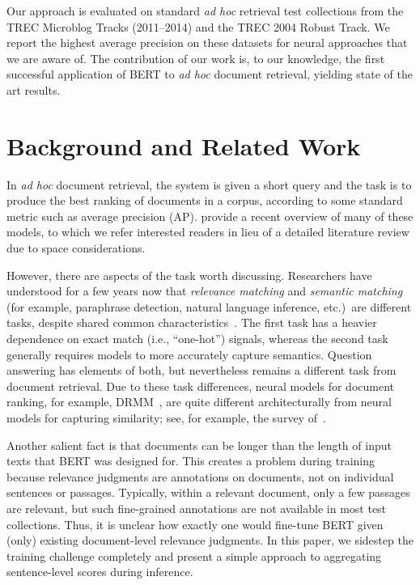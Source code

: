 \documentclass[11pt,a4paper]{article}
\begin{document}
Our approach is evaluated on standard {\it ad hoc} retrieval test collections from the TREC Microblog Tracks (2011--2014) and the TREC 2004 Robust Track.
We report the highest average precision on these datasets for neural approaches that we are aware of.
The contribution of our work is, to our knowledge, the first successful application of BERT to {\it ad hoc} document retrieval, yielding state of the art results.

\section{Background and Related Work}

In {\it ad hoc} document retrieval, the system is given a short query  and the task is to produce the best ranking of documents in a corpus, according to some standard metric such as average precision (AP).
\citet{MitraBhaskar_Craswell_2019} provide a recent overview of many of these models, to which we refer interested readers in lieu of a detailed literature review due to space considerations.

However, there are aspects of the task worth discussing.
Researchers have understood for a few years now that {\it relevance matching} and {\it semantic matching} (for example, paraphrase detection, natural language inference, etc.)~are different tasks, despite shared common characteristics~\cite{Guo:2016:DRM:2983323.2983769}.
The first task has a heavier dependence on exact match (i.e., ``one-hot'') signals, whereas the second task generally requires models to more accurately capture semantics.
Question answering has elements of both, but nevertheless remains a different task from document retrieval.
Due to these task differences, neural models for document ranking, for example, DRMM~\cite{Guo:2016:DRM:2983323.2983769}, are quite different architecturally from neural models for capturing similarity; see, for example, the survey of~\citet{C18-1328}.

Another salient fact is that documents can be longer than the length of input texts that BERT was designed for.
This creates a problem during training because relevance judgments are annotations on documents, not on individual sentences or passages.
Typically, within a relevant document, only a few passages are relevant, but such fine-grained annotations are not available in most test collections.
Thus, it is unclear how exactly one would fine-tune BERT given (only) existing document-level relevance judgments.
In this paper, we sidestep the training challenge completely and present a simple approach to aggregating sentence-level scores during inference.
\end{document}
